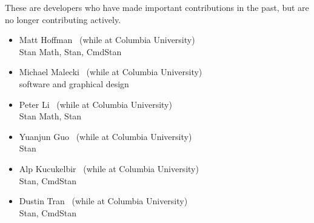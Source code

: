 These are developers who have made important contributions in the
past, but are no longer contributing actively.

\begin{itemize}
\item Matt Hoffman \ (while at Columbia University)
\\ {\footnotesize Stan Math, Stan, CmdStan}
\item Michael Malecki \ (while at Columbia University)
\\ {\footnotesize software and graphical design}
\item Peter Li \   (while at Columbia University)
\\ {\footnotesize Stan Math, Stan}
\item Yuanjun Guo \ (while at Columbia University)
\\ {\footnotesize Stan}
\item Alp Kucukelbir \ (while at Columbia University)
\\ {\footnotesize Stan, CmdStan}
\item Dustin Tran \ (while at Columbia University)
\\ {\footnotesize Stan, CmdStan}
\end{itemize}

